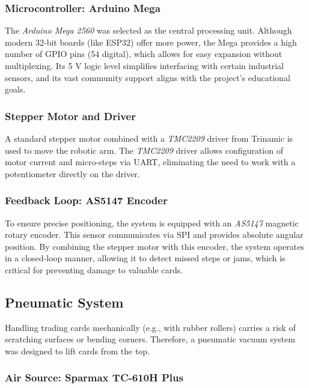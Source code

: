 \subsubsection{Microcontroller: Arduino Mega}
The \textit{Arduino Mega 2560} was selected as the central processing unit. Although modern 32-bit boards (like ESP32) 
offer more power, the Mega provides a high number of GPIO pins (54 digital), which allows for easy expansion without 
multiplexing. Its 5 V logic level simplifies interfacing with certain industrial sensors, and its vast community support 
aligns with the project's educational goals.

\subsubsection{Stepper Motor and Driver}
A standard stepper motor combined with a \textit{TMC2209} driver from Trinamic is used to move the robotic arm. 
The \textit{TMC2209} driver allows configuration of motor current and micro-steps via UART, eliminating the need to work 
with a potentiometer directly on the driver. 

\subsubsection{Feedback Loop: AS5147 Encoder}
To ensure precise positioning, the system is equipped with an \textit{AS5147} magnetic rotary encoder. This sensor 
communicates via SPI and provides absolute angular position. By combining the stepper motor with this encoder, the 
system operates in a closed-loop manner, allowing it to detect missed steps or jams, which is critical for preventing 
damage to valuable cards.

\subsection{Pneumatic System}

Handling trading cards mechanically (e.g., with rubber rollers) carries a risk of scratching surfaces or bending 
corners. Therefore, a pneumatic vacuum system was designed to lift cards from the top.

\subsubsection{Air Source: Sparmax TC-610H Plus} %


